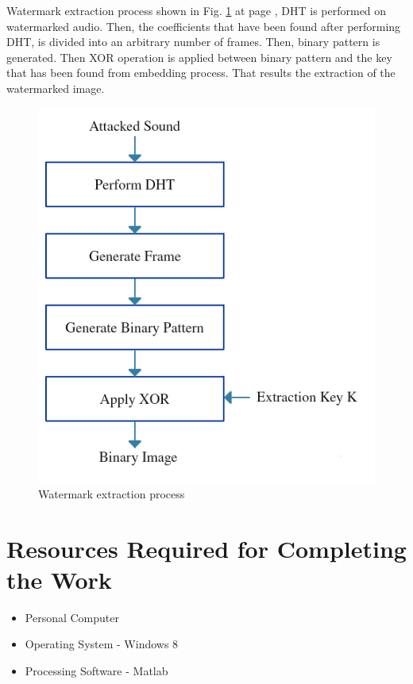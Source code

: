 \documentclass[12pt,a4paper]{article}
\begin{document}
\newpage

Watermark extraction process shown in Fig. \ref{fig:extraction} at page \pageref{fig:extraction}, DHT is performed on watermarked audio. Then, the coefficients that have been found after performing DHT, is divided into an arbitrary number of frames. Then, binary pattern is generated. Then XOR operation is applied between binary pattern and the key that has been found from embedding process. That results the extraction of the watermarked image.

\begin{figure}[h!]
\centering
\includegraphics[scale=.7]{image/Extraction(proposal)}
\caption{Watermark extraction process}
\label{fig:extraction}
\end{figure}

\newpage

\section{Resources Required for Completing the Work}

\begin{itemize}
\item Personal Computer
\item Operating System - Windows 8
\item Processing Software - Matlab
\end{itemize}
\end{document}
